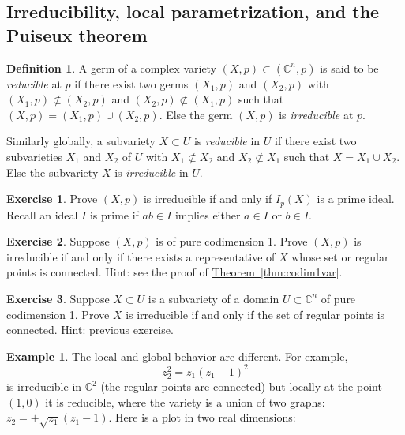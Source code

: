 \documentclass[12pt,openany]{book}
\newcommand{\C}{{\mathbb{C}}}
\newcommand{\myindex}[1]{#1\index{#1}}
\theoremstyle{plain}
\theoremstyle{remark}
\theoremstyle{definition}
\newtheorem{defn}[thm]{Definition}
\newenvironment{exbox}{%
    \def\FrameCommand{\vrule width 1pt \relax\hspace {10pt}}%
    \MakeFramed {\advance \hsize -\width \FrameRestore }%
}{%
    \endMakeFramed
}
\theoremstyle{exercise}
\newtheorem{exercise}{Exercise}[section]
\theoremstyle{example}
\newtheorem{example}[thm]{Example}
\newcommand{\thmref}[1]{\hyperref[#1]{Theorem~\ref*{#1}}}
\begin{document}
\subsection{Irreducibility, local parametrization, and the Puiseux
theorem}


\begin{defn}
A germ of a complex variety $(X,p) \subset (\C^n,p)$ is said to be
\emph{\myindex{reducible}} at $p$ if there exist
two germs $(X_1,p)$ and $(X_2,p)$ with
$(X_1,p) \not\subset (X_2,p)$ and
$(X_2,p) \not\subset (X_1,p)$ such that
$(X,p) = (X_1,p) \cup (X_2,p)$.
Else the germ $(X,p)$ is \emph{\myindex{irreducible}} at $p$.

Similarly globally, a subvariety $X \subset U$ is
\emph{reducible} in $U$ if there exist
two subvarieties
$X_1$ and $X_2$ of $U$ with
$X_1 \not\subset X_2$ and
$X_2 \not\subset X_1$ such that
$X = X_1 \cup X_2$.
Else the subvariety $X$ is \emph{irreducible} in $U$.
\end{defn}

\begin{exbox}
\begin{exercise}
Prove $(X,p)$ is irreducible if and only if $I_p(X)$ is a prime ideal.
Recall an ideal $I$ is prime if $ab \in I$ implies either $a \in I$ or $b
\in I$.
\end{exercise}

\begin{exercise}
Suppose $(X,p)$ is of pure codimension 1.
Prove $(X,p)$ is irreducible if and only if there
exists a representative of $X$ whose set or regular points
is connected.  Hint: see the proof of \thmref{thm:codim1var}.
\end{exercise}

\begin{exercise}
Suppose $X \subset U$ is a subvariety of a domain $U \subset \C^n$
of pure codimension 1.
Prove $X$ is irreducible if and only if the set of regular points
is connected.  Hint: previous exercise.
\end{exercise}
\end{exbox}

\begin{example}
The local and global behavior are different.  For example,
\begin{equation*}
z_2^2 = z_1{(z_1-1)}^2
\end{equation*}
is irreducible in $\C^2$ (the regular points are connected) but locally
at the point
$(1,0)$ it is reducible, where the variety is
a union of two graphs: $z_2 = \pm \sqrt{z_1}(z_1-1)$.
Here is a plot in two real dimensions:


\begin{center}
\medskip

\bigskip
\end{center}
\end{example}
\end{document}

